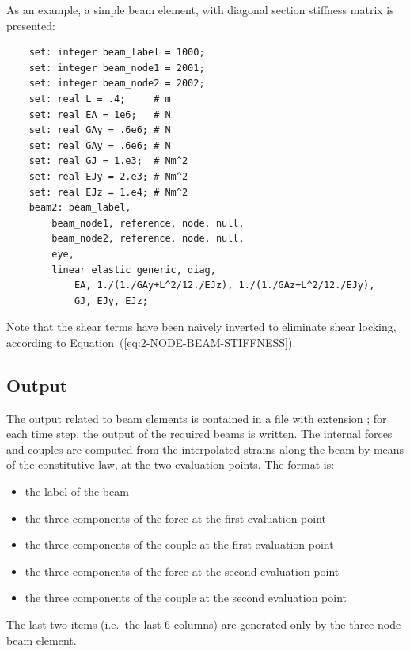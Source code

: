 As an example, a simple beam element, with diagonal section stiffness 
matrix is presented:
\begin{verbatim}
    set: integer beam_label = 1000;
    set: integer beam_node1 = 2001;
    set: integer beam_node2 = 2002;
    set: real L = .4;     # m
    set: real EA = 1e6;   # N
    set: real GAy = .6e6; # N
    set: real GAy = .6e6; # N
    set: real GJ = 1.e3;  # Nm^2
    set: real EJy = 2.e3; # Nm^2
    set: real EJz = 1.e4; # Nm^2
    beam2: beam_label,
        beam_node1, reference, node, null,
        beam_node2, reference, node, null,
        eye,
        linear elastic generic, diag,
            EA, 1./(1./GAy+L^2/12./EJz), 1./(1./GAz+L^2/12./EJy),
            GJ, EJy, EJz;
\end{verbatim}
Note that the shear terms have been na\"{\i}vely inverted to eliminate
shear locking, according to Equation~(\ref{eq:2-NODE-BEAM-STIFFNESS}).

\subsection{Output}
The output related to beam elements is contained in a file with extension 
; for each time step, the output of the required beams is
written.
The internal forces and couples are computed from the interpolated strains
along the beam by means of the constitutive law, at the two evaluation
points. 
The format is:
\begin{itemize}
    \item the label of the beam
    \item the three components of the force at the first evaluation point
    \item the three components of the couple at the first evaluation point
    \item the three components of the force at the second evaluation point
    \item the three components of the couple at the second evaluation point    
\end{itemize}
The last two items (i.e.\ the last 6 columns) are generated
only by the three-node beam element.



